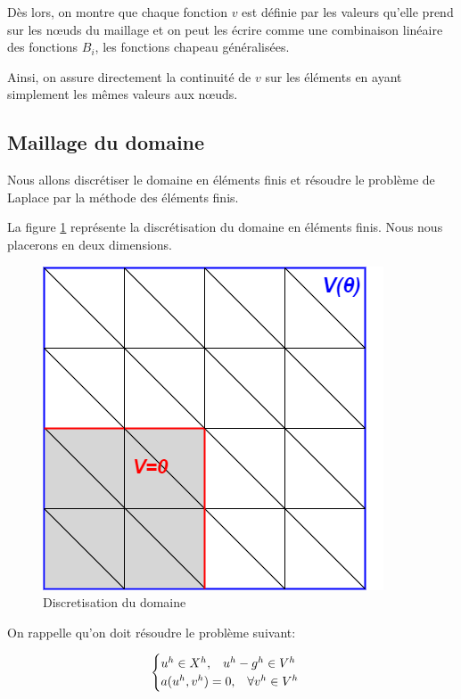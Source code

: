 \documentclass{article}
\begin{document}
Dès lors, on montre que chaque fonction $v$
est définie par les valeurs qu'elle prend
sur les nœuds du maillage et on peut les écrire comme une combinaison
linéaire des fonctions $B_i$, les fonctions chapeau généralisées.

Ainsi, on assure directement la continuité de $v$ sur les éléments en
ayant simplement les mêmes valeurs aux nœuds.


\subsection{Maillage du domaine}

\hspace{0.5cm}
Nous allons discrétiser le domaine en éléments finis et résoudre le problème
de Laplace par la méthode des éléments finis.

La figure \ref{fig:pointe_ef} représente la discrétisation du domaine en éléments
finis. Nous nous placerons en deux dimensions.

\begin{figure}[h]
    \centering
    \hspace{1cm} \includegraphics[scale= 0.7]{img/pointe_ef.png}
    \caption{Discretisation du domaine}
    \label{fig:pointe_ef}
\end{figure}

On rappelle qu'on doit résoudre le problème suivant:

\begin{equation}
    \begin{cases}
        u^h \in X^h, \hspace{0.3cm} u^h - g^h \in V^h \\
        a(u^h, v^h) = 0, \hspace{0.3cm} \forall v^h \in V^h
    \end{cases}   
\end{equation}
\end{document}
